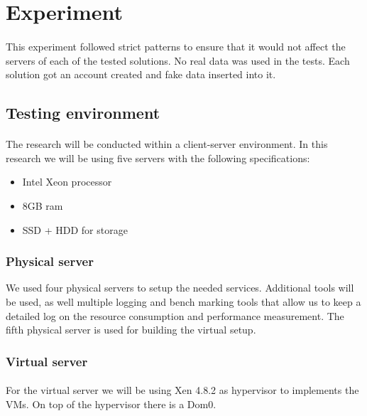\section{Experiment}
\paragraph{}
This experiment followed strict patterns to ensure that it would not affect the servers of each of the tested solutions. No real data was used in the tests. Each solution got an account created and fake data inserted into it.


\subsection{Testing environment}
\paragraph{}
The research will be conducted within a client-server environment. In this research we will be using five servers with the following specifications:
\begin{itemize}
	\item Intel Xeon processor
	\item 8GB ram
	\item SSD + HDD for storage
\end{itemize}

\subsubsection{Physical server}
 We used four physical servers to setup the needed services. Additional tools will be used, as well multiple logging and bench marking tools that allow us to keep a detailed log on the resource consumption and performance measurement. The fifth physical server is used for building the virtual setup.

\subsubsection{Virtual server}
\paragraph{}
For the virtual server we will be using Xen 4.8.2 as hypervisor to implements the VMs. On top of the hypervisor there is a Dom0.
 
